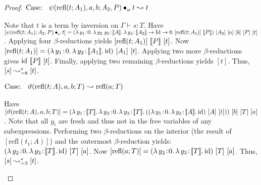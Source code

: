 \begin{proof}
    $\text{Case: }\begin{array}{c} \psi(\text{refl}(t; A_1), a, b; A_2, P) \bullet_{\omega} t \leadsto t \end{array}$
    \begin{proofcase}
        Note that $t$ is a term by inversion on $\Gamma \vdash s : T$.
        Have $[\app{\psi(\text{refl}(t; A_1); A_2, P)}{\omega}{t}] =
            (\abs{\lambda}{y_1}{0}{
                \abs{\lambda}{y_2\ y_3}{\sema{A}}{
                    \abs{\lambda}{y_4}{\sema{A_2} \to \fpId \to 0}{
                        [\text{refl}(t; A_1)]\ \sema{P}
                    }
                }
            })\ [A_2]\ [a]\ [b]\ [P]\ [t]$.
        Applying four $\beta$-reductions yields $[\text{refl}(t; A_1)]\ \sema{P}\ [t]$.
        Now $[\text{refl}(t; A_1)] =
            ({\lambda}\, y_1\! : \! 0.\, 
                {\lambda}\, y_2\! : \! \llbracket A_1 \rrbracket.\, \textnormal{id}
           )\ [A_1]\ [t]$.
        Applying two more $\beta$-reductions gives $\textnormal{id}\ \llbracket P \rrbracket\ [t]$.
        Finally, applying two remaining $\beta$-reductions yields $[t]$.
        Thus, $[s] \leadsto^*_{=8} [t]$.
    \end{proofcase}
    
    $\text{Case: }\begin{array}{c} \vartheta(\text{refl}(t; A), a, b; T) \leadsto \text{refl}(a; T) \end{array}$
    \begin{proofcase}
        Have $[\vartheta(\text{refl}(t; A), a, b; T)] = (\abs{\lambda}{y_1}{\sema{T}}{
                \abs{\lambda}{y_2}{0} {
                    \abs{\lambda}{y_3}{\sema{T}}{
                        ((\abs{\lambda}{y_1}{0}{
                            \abs{\lambda}{y_2}{\sema{A}}{\fpid}
                        })\ [A]\ [t])
                    }
                }
            })\ [b]\ [T]\ [a]$.
        Note that all $y_i$ are fresh and thus not in the free variables of any subexpressions.
        Performing two $\beta$-reductions on the interior (the result of $[\text{refl}(t_1;A)]$) and the outermost $\beta$-reduction yields:
            $(\abs{\lambda}{y_2}{0} {
                \abs{\lambda}{y_3}{\sema{T}}{
                    \fpid
                }
            })\ [T]\ [a]$.
        Now $[\text{refl}(a; T)] = (\abs{\lambda}{y_2}{0} {
                \abs{\lambda}{y_3}{\sema{T}}{
                    \fpid
                }
            })\ [T]\ [a]$.
        Thus, $[s] \leadsto^*_{=3} [t]$.
    \end{proofcase}
\end{proof}

